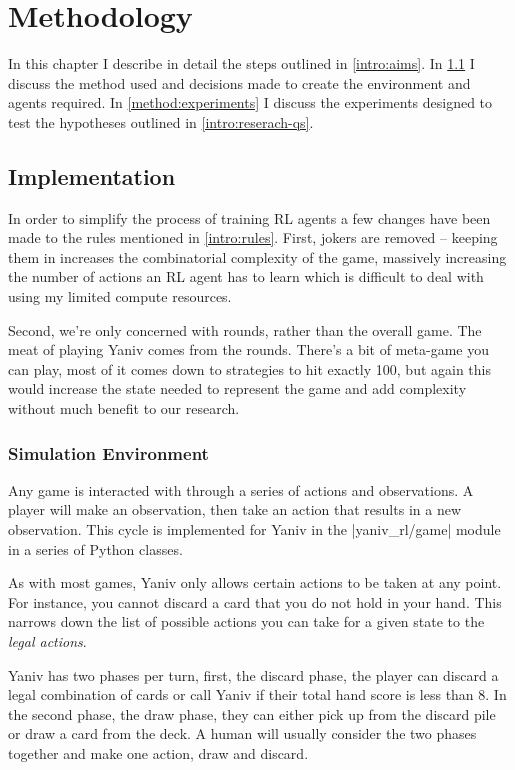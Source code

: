 \documentclass[../main.tex]{subfiles}
\begin{document}
\chapter{Methodology}
\label{cha:Methodology}
In this chapter I describe in detail the steps outlined in \cref{intro:aims}. In \cref{method:implementation} I discuss the method used and decisions made to create the environment and agents required. In \cref{method:experiments} I discuss the experiments designed to test the hypotheses outlined in \cref{intro:reserach-qs}. 

\section{Implementation} \label{method:implementation}
In order to simplify the process of training RL agents a few changes have been made to the rules mentioned in \cref{intro:rules}. First, jokers are removed -- keeping them in increases the combinatorial complexity of the game, massively increasing the number of actions an RL agent has to learn which is difficult to deal with using my limited compute resources. 

Second, we're only concerned with rounds, rather than the overall game. The meat of playing Yaniv comes from the rounds. There's a bit of meta-game you can play, most of it comes down to strategies to hit exactly 100, but again this would increase the state needed to represent the game and add complexity without much benefit to our research.

\subsection{Simulation Environment}
Any game is interacted with through a series of actions and observations. A player will make an observation, then take an action that results in a new observation. This cycle is implemented for Yaniv in the |yaniv_rl/game| module in a series of Python classes. 

As with most games, Yaniv only allows certain actions to be taken at any point. For instance, you cannot discard a card that you do not hold in your hand. This narrows down the list of possible actions you can take for a given state to the \textit{legal actions}.

Yaniv has two phases per turn, first, the discard phase, the player can discard a legal combination of cards or call Yaniv if their total hand score is less than 8. In the second phase, the draw phase, they can either pick up from the discard pile or draw a card from the deck. A human will usually consider the two phases together and make one action, draw and discard. 
\end{document}
